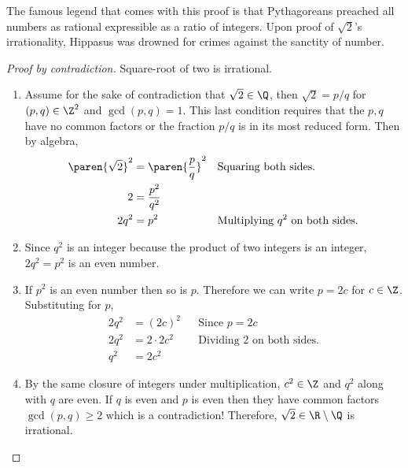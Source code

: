 \documentclass{homework}
\begin{document}
The famous legend that comes with this proof is that Pythagoreans preached all numbers as rational \ie expressible as a ratio of integers. Upon proof of $\sqrt{2}$'s irrationality, Hippasus was drowned for crimes against the sanctity of number.

\begin{proof}[Proof by contradiction] Square-root of two is irrational.
    \begin{enumerate}
        \item Assume for the sake of contradiction that $\sqrt{2} \in \Q$, then $\sqrt{2} = p/q$ for $(p,q)\in \Z^2$ and $\gcd(p,q)=1$. This last condition requires that the $p,q$ have no common factors or the fraction $p/q$ is in its most reduced form. Then by algebra,
              \begin{align*}
                  \paren{\sqrt{2}}^2 & = \paren{\frac{p}{q}}^2 &  & \text{Squaring both sides.}                    \\
                  2                  & = \frac{p^2}{q^2}                                                           \\
                  2q^2               & = p^2                   &  & \text{Multiplying } q^2 \text{ on both sides.} \\
              \end{align*}
        \item Since $q^2$ is an integer because the product of two integers is an integer, $2q^2=p^2$ is an even number.
        \item If $p^2$ is an even number then so is $p$. Therefore we can write $p=2c$ for $c\in \Z$. Substituting for $p$,
              \begin{align*}
                  2q^2 & =(2c)^2     &  & \text{Since } p = 2c                      \\
                  2q^2 & =2\cdot2c^2 &  & \text{Dividing } 2 \text{ on both sides.} \\
                  q^2  & =2c^2
              \end{align*}
        \item By the same closure of integers under multiplication, $c^2 \in \Z$ and $q^2$ along with $q$ are even. If $q$ is even and $p$ is even then they have common factors $\gcd(p,q) \geq 2$ which is a contradiction! Therefore, $\sqrt{2} \in \R\setminus \Q$ is irrational. \qedhere
    \end{enumerate}
\end{proof}
\end{document}
